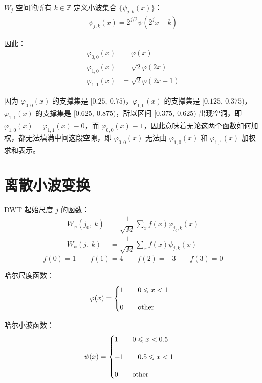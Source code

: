 \documentclass{article}
\begin{document}
$W_j$ 空间的所有 $k\in\mathbb{Z}$ 定义小波集合 $\{\psi_{j,k}(x)\}$：
\begin{align*}
    \psi_{j,k}(x)=2^{j/2}\psi(2^jx-k)
\end{align*}

因此：
\begin{align*}
    \varphi_{0,0}(x)&=\varphi(x)
    \\
    \varphi_{1,0}(x)&=\sqrt{2}\varphi(2x)
    \\
    \varphi_{1,1}(x)&=\sqrt{2}\varphi(2x-1)
\end{align*}

因为 $\varphi_{0,0}(x)$ 的支撑集是 $[0.25,\ 0.75)$，$\varphi_{1,0}(x)$ 的支撑集是 $[0.125,\ 0.375)$，$\varphi_{1,1}(x)$ 的支撑集是 $[0.625,\ 0.875)$，所以区间 $[0.375,\ 0.625)$ 出现空洞，即 $\varphi_{1,0}(x)=\varphi_{1,1}(x)\equiv0$，而 $\varphi_{0,0}(x)\equiv1$，因此意味着无论这两个函数如何加权，都无法填满中间这段空隙，即 $\varphi_{0,0}(x)$ 无法由 $\varphi_{1,0}(x)$ 和 $\varphi_{1,1}(x)$ 加权求和表示。



\section{离散小波变换}
DWT 起始尺度 $j$ 的函数：
\begin{align*}
    W_{\varphi}(j_0,\ k)&=\dfrac{1}{\sqrt{M}}\sum_{x}f(x)\varphi_{j_0,k}(x)
    \\
    W_{\psi}(j,\ k)&=\dfrac{1}{\sqrt{M}}\sum_{x}f(x)\psi_{j,k}(x)
\end{align*}
\[ f(0)=1\qquad f(1)=4\qquad f(2)=-3\qquad f(3)=0 \]

哈尔尺度函数：
\begin{align*}
    \varphi(x)=\begin{cases}
        1\qquad0\leqslant x<1
        \\[10pt]
        0\qquad\rm other
    \end{cases}
\end{align*}

哈尔小波函数：
\begin{align*}
    \psi(x)=\begin{cases}
        1\qquad0\leqslant x<0.5
        \\[10pt]
        -1\qquad0.5\leqslant x<1
        \\[10pt]
        0\qquad\rm other
    \end{cases}
\end{align*}
\end{document}
